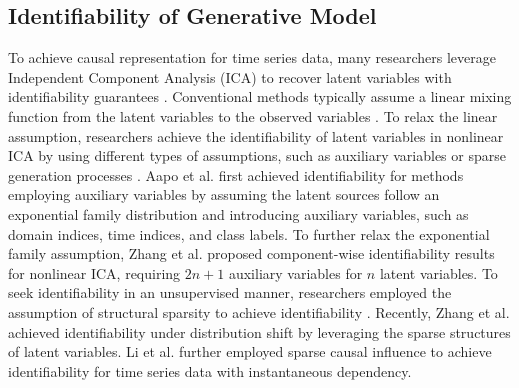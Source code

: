 \subsection{Identifiability of Generative Model}
To achieve causal representation \cite{rajendran2024learning,mansouri2023object,wendong2024causal} for time series data, many researchers leverage Independent Component Analysis (ICA) to recover latent variables with identifiability guarantees \cite{yao2023multi,scholkopf2021toward,Liu2023CausalTriplet,gresele2020incomplete}. Conventional methods typically assume a linear mixing function from the latent variables to the observed variables \cite{comon1994independent,hyvarinen2013independent,lee1998independent,zhang2007kernel}. To relax the linear assumption, researchers achieve the identifiability of latent variables in nonlinear ICA by using different types of assumptions, such as auxiliary variables or sparse generation processes \cite{zheng2022identifiability,hyvarinen1999nonlinear,hyvarinen2023identifiability,khemakhem2020ice,li2023identifying}. Aapo et al. \cite{hyvarinen2017nonlinear} first achieved identifiability for methods employing auxiliary variables by assuming the latent sources follow an exponential family distribution and introducing auxiliary variables, such as domain indices, time indices, and class labels. To further relax the exponential family assumption, Zhang et al. \cite{kong2022partial,xie2022multi, kong2023identification,yan2023counterfactual, xie2022multi} proposed component-wise identifiability results for nonlinear ICA, requiring $2n+1$ auxiliary variables for $n$ latent variables. To seek identifiability in an unsupervised manner, researchers employed the assumption of structural sparsity to achieve identifiability \cite{ng2024identifiability,lachapelle2022disentanglement,zheng2022identifiability, xu2024sparsity}. Recently, Zhang et al. \cite{zhang2024causal} achieved identifiability under distribution shift by leveraging the sparse structures of latent variables. Li et al. \cite{li2024identification} further employed sparse causal influence to achieve identifiability for time series data with instantaneous dependency.


